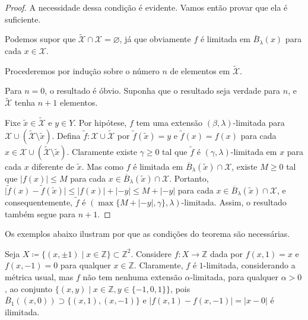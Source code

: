 \begin{proof}
  A necessidade dessa condição é evidente. Vamos então provar que ela é suficiente.

  Podemos supor que $\tilde{\mathcal{X}} \cap \mathcal{X} = \varnothing$, já que obviamente $f$ é limitada em $\overline{B}_{\lambda}(x)$ para cada $x \in \mathcal{X}$.

  Procederemos por indução sobre o número $n$ de elementos em $\tilde{\mathcal{X}}$.

  Para $n = 0$, o resultado é óbvio. Suponha que o resultado seja verdade para $n$, e $\tilde{\mathcal{X}}$ tenha $n+1$ elementos.

  Fixe $\tilde{x} \in \tilde{\mathcal{X}}$ e $y \in Y$. Por hipótese, $f$ tem uma extensão $(\beta,\lambda)$-limitada para $\mathcal{X} \cup (\tilde{\mathcal{X}} \setminus {\tilde{x}})$. Defina $\tilde{f} : \mathcal{X} \cup \tilde{\mathcal{X}}$ por $\tilde{f}(\tilde{x}) = y$ e $\tilde{f}(x) = f(x)$ para cada $x \in \mathcal{X} \cup (\tilde{\mathcal{X}} \setminus {\tilde{x}})$. Claramente existe $\gamma \ge 0$ tal que $\tilde{f}$ é $(\gamma,\lambda)$-limitada em $x$ para cada $x$ diferente de $\tilde{x}$. Mas como $f$ é limitada em $\overline{B}_{\lambda}(\tilde{x}) \cap \mathcal{X}$, existe $M \ge 0$ tal que $\lvert f(x) \rvert \le M$ para cada $x \in \overline{B}_{\lambda}(\tilde{x}) \cap \mathcal{X}$. Portanto, $\lvert \tilde{f}(x)-\tilde{f}(\tilde{x})\rvert \le \lvert f(x)\rvert + \lvert -y\rvert \le M + \lvert-y\rvert$ para cada $x \in \overline{B}_{\lambda}(\tilde{x}) \cap \mathcal{X}$, e consequentemente, $\tilde{f}$ é $(\max\{M + \lvert-y\rvert, \gamma\},\lambda)$-limitada. Assim, o resultado também segue para $n+1$.
\end{proof}

Os exemplos abaixo ilustram por que as condições do teorema são necessárias.

\begin{example}
  Seja $X \coloneqq \{(x, \pm 1) \mid x \in \mathbb{Z}\} \subset \mathbb{Z}^2$. Considere $f : X \to \mathbb{Z}$ dada por $f(x, 1) = x$ e $f(x, -1) = 0$ para qualquer $x \in \mathbb{Z}$. Claramente, $f$ é $1$-limitada, considerando a métrica usual, mas $f$ não tem nenhuma extensão $\alpha$-limitada, para qualquer $\alpha > 0$, ao conjunto $\{(x, y) \mid x \in \mathbb{Z}, y \in \{-1,0,1\}\}$, pois $\overline{B}_1((x, 0)) \supset \{ (x, 1), (x, -1) \}$ e $\lvert f(x, 1) - f(x, -1) \rvert = \lvert x - 0 \rvert$ é ilimitada.
\end{example}

